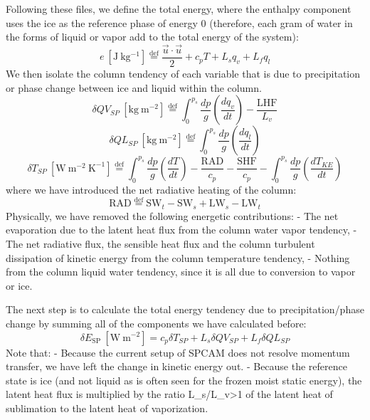 \documentclass[11pt]{article}
\begin{document}
Following these files, we define the total energy, where the enthalpy
component uses the ice as the reference phase of energy 0 (therefore,
each gram of water in the forms of liquid or vapor add to the total
energy of the system): \[
e\ \left[\mathrm{J\ kg^{-1}}\right]\overset{\mathrm{def}}{=}\frac{\overrightarrow{u}\cdot\overrightarrow{u}}{2}+c_{p}T+L_{s}q_{v}+L_{f}q_{l}
\] We then isolate the column tendency of each variable that is due to
precipitation or phase change between ice and liquid within the column.
\[
\delta QV_{SP}\ \left[\mathrm{kg\ m^{-2}}\right]\overset{\mathrm{def}}{=}\int_{0}^{p_{s}}\frac{dp}{g}\left(\frac{dq_{v}}{dt}\right)-\frac{\mathrm{LHF}}{L_{v}}
\] \[
\delta QL_{SP}\ \left[\mathrm{kg\ m^{-2}}\right]\overset{\mathrm{def}}{=}\int_{0}^{p_{s}}\frac{dp}{g}\left(\frac{dq_{l}}{dt}\right)
\] \[
\delta T_{SP}\ \left[\mathrm{W\ m^{-2}\ K^{-1}}\right]\overset{\mathrm{def}}{=}\int_{0}^{p_{s}}\frac{dp}{g}\left(\frac{dT}{dt}\right)-\frac{\mathrm{RAD}}{c_{p}}-\frac{\mathrm{SHF}}{c_{p}}-\int_{0}^{p_{s}}\frac{dp}{g}\left(\frac{dT_{KE}}{dt}\right)
\] where we have introduced the net radiative heating of the column: \[
\mathrm{RAD}\overset{\mathrm{def}}{=}\mathrm{SW}_{t}-\mathrm{SW}_{s}+\mathrm{LW}_{s}-\mathrm{LW}_{t}
\] Physically, we have removed the following energetic contributions: -
The net evaporation due to the latent heat flux from the column water
vapor tendency, - The net radiative flux, the sensible heat flux and the
column turbulent dissipation of kinetic energy from the column
temperature tendency, - Nothing from the column liquid water tendency,
since it is all due to conversion to vapor or ice.

The next step is to calculate the total energy tendency due to
precipitation/phase change by summing all of the components we have
calculated before: \[
\delta E_{\mathrm{SP}}\ \left[\mathrm{W\ m^{-2}}\right]=c_{p}\delta T_{SP}+L_{s}\delta QV_{SP}+L_{f}\delta QL_{SP}
\] Note that: - Because the current setup of SPCAM does not resolve
momentum transfer, we have left the change in kinetic energy out. -
Because the reference state is ice (and not liquid as is often seen for
the frozen moist static energy), the latent heat flux is multiplied by
the ratio L\_s/L\_v\textgreater{}1 of the latent heat of sublimation to
the latent heat of vaporization.
\end{document}
